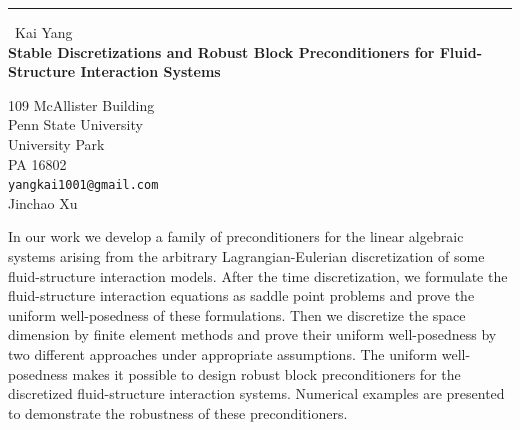 \documentclass{report}
\begin{document}
\begin{center}
\rule{6in}{1pt} \
{\large Kai Yang \\
{\bf Stable Discretizations and Robust Block Preconditioners for Fluid-Structure Interaction Systems}}

109 McAllister Building \\ Penn State University \\ University Park \\ PA 16802
\\
{\tt yangkai1001@gmail.com}\\
Jinchao Xu\end{center}

In our work we develop a family of preconditioners for the linear
algebraic systems arising from the arbitrary Lagrangian-Eulerian
discretization of some fluid-structure interaction models. After the time
discretization, we formulate the fluid-structure interaction equations as
saddle point problems and prove the uniform well-posedness of these
formulations. Then we discretize the space dimension by finite element
methods and prove their uniform well-posedness by two different
approaches under appropriate assumptions. The uniform well-posedness
makes it possible to design robust block preconditioners for the
discretized fluid-structure interaction systems. Numerical examples are
presented to demonstrate the robustness of these preconditioners.
\end{document}
